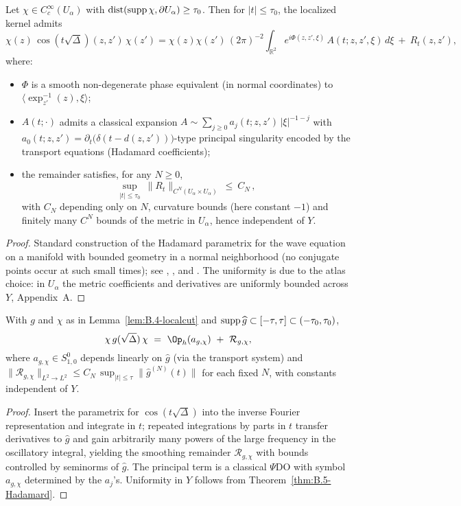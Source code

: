 \begin{theorem}\label{thm:B.5-Hadamard}
Let $\chi\in C_c^\infty(U_\alpha)$ with $\operatorname{dist}(\operatorname{supp}\chi,\partial U_\alpha)\ge \tau_0$.
Then for $|t|\le \tau_0$, the localized kernel admits
\[
\chi(z)\,\cos(t\sqrt\Delta)(z,z')\,\chi(z')
= \chi(z)\chi(z')\,(2\pi)^{-2}\!\!\int_{\mathbb R^2} e^{i\Phi(z,z',\xi)}\,A(t;z,z',\xi)\,d\xi
\ +\ R_{t}(z,z'),
\]
where:
\begin{itemize}
\item $\Phi$ is a smooth non-degenerate phase equivalent (in normal coordinates) to
$\langle \exp^{-1}_{z'}(z),\xi\rangle$;
\item $A(t;\cdot)$ admits a classical expansion $A\sim \sum_{j\ge 0} a_j(t;z,z')\,|\xi|^{-1-j}$ with
$a_0(t;z,z')=\partial_t\big(\delta(t-d(z,z'))\big)$-type principal singularity encoded
by the transport equations (Hadamard coefficients);
\item the remainder satisfies, for any $N\ge 0$,
\[
\sup_{|t|\le \tau_0}\ \|R_t\|_{C^N(U_\alpha\times U_\alpha)}\ \le\ C_{N}\,,
\]
with $C_N$ depending only on $N$, curvature bounds (here constant $-1$) and finitely many $C^N$ bounds of the metric in $U_\alpha$, hence independent of $Y$.
\end{itemize}
\end{theorem}

\begin{proof}
Standard construction of the Hadamard parametrix for the wave equation on a manifold with bounded geometry in a normal neighborhood (no conjugate points occur at such small times); see \cite[Ch.~7]{HormanderI}, \cite[§5]{Sogge}, and \cite[§11]{Zworski}. The uniformity is due to the atlas choice: in $U_\alpha$ the metric coefficients and derivatives are uniformly bounded across $Y$, Appendix~A.
\end{proof}

\begin{corollary}\label{cor:B.5-window}
With $g$ and $\chi$ as in Lemma~\ref{lem:B.4-localcut} and $\operatorname{supp}\widehat g\subset[-\tau,\tau]\subset(-\tau_0,\tau_0)$,
\[
\chi\,g(\sqrt\Delta)\,\chi\ =\ \Op_h(a_{g,\chi})\ +\ \mathcal R_{g,\chi},
\]
where $a_{g,\chi}\in S^0_{1,0}$ depends linearly on $\widehat g$ (via the transport system) and
$\|\mathcal R_{g,\chi}\|_{L^2\to L^2}\le C_N\,\sup_{|t|\le \tau}\|\widehat g^{(N)}(t)\|$ for each fixed $N$,
with constants independent of $Y$.
\end{corollary}

\begin{proof}
Insert the parametrix for $\cos(t\sqrt\Delta)$ into the inverse Fourier representation
and integrate in $t$; repeated integrations by parts in $t$ transfer derivatives to $\widehat g$ and gain arbitrarily many powers of the large frequency in the oscillatory integral, yielding the smoothing remainder $\mathcal R_{g,\chi}$ with bounds controlled by seminorms of $\widehat g$. The principal term is a classical $\Psi$DO with symbol $a_{g,\chi}$ determined by the $a_j$’s. Uniformity in $Y$ follows from Theorem~\ref{thm:B.5-Hadamard}.
\end{proof}

